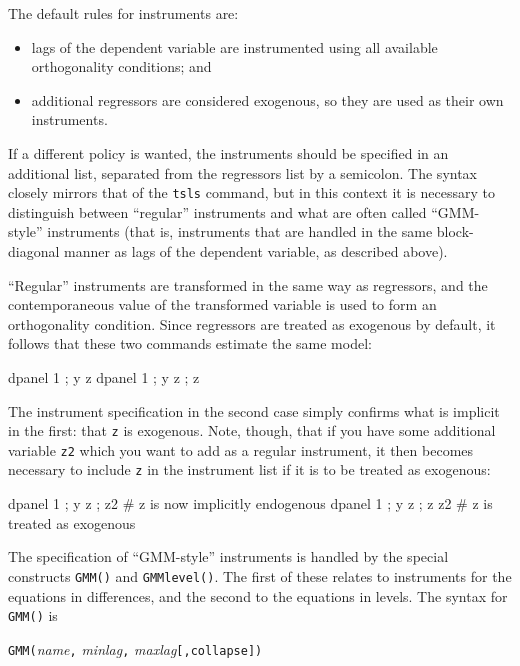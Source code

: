 The default rules for instruments are: 
\begin{itemize}
\item lags of the dependent variable are instrumented using all
  available orthogonality conditions; and
\item additional regressors are considered exogenous, so they are used
  as their own instruments.
\end{itemize}

If a different policy is wanted, the instruments should be specified
in an additional list, separated from the regressors list by a
semicolon. The syntax closely mirrors that of the \texttt{tsls}
command, but in this context it is necessary to distinguish between
``regular'' instruments and what are often called ``GMM-style''
instruments (that is, instruments that are handled in the same
block-diagonal manner as lags of the dependent variable, as described
above).

``Regular'' instruments are transformed in the same way as
regressors, and the contemporaneous value of the transformed variable
is used to form an orthogonality condition. Since regressors are
treated as exogenous by default, it follows that these two commands
estimate the same model:

\begin{code}
  dpanel 1 ; y z
  dpanel 1 ; y z ; z
\end{code}
The instrument specification in the second case simply confirms what
is implicit in the first: that \texttt{z} is exogenous. Note, though,
that if you have some additional variable \texttt{z2} which you want
to add as a regular instrument, it then becomes necessary to 
include \texttt{z} in the instrument list if it is to be treated
as exogenous:
\begin{code}
  dpanel 1 ; y z ; z2   # z is now implicitly endogenous
  dpanel 1 ; y z ; z z2 # z is treated as exogenous
\end{code}

The specification of ``GMM-style'' instruments is handled by the
special constructs \texttt{GMM()} and \texttt{GMMlevel()}.  The first
of these relates to instruments for the equations in differences, and
the second to the equations in levels. The syntax for \texttt{GMM()}
is

\begin{altcode}
\texttt{GMM(}\textsl{name}\texttt{,} \textsl{minlag}\texttt{,} 
\textsl{maxlag}\texttt{[,collapse])}
\end{altcode}

